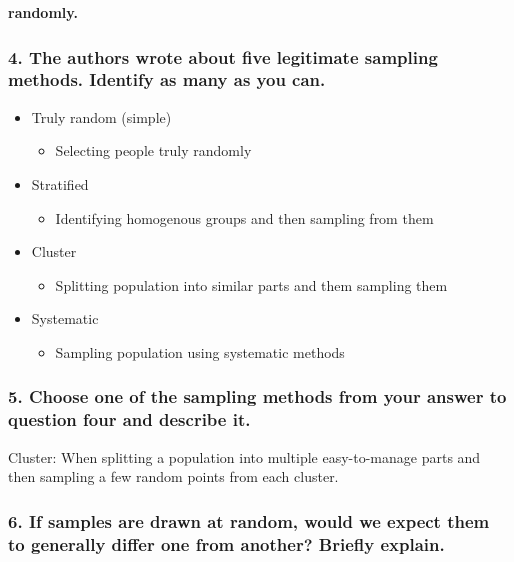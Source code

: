 \documentclass[letterpaper]{article}
\def\tightlist{}
\begin{document}
 \textbf{ randomly. } 

\subsubsection{4. The authors wrote about five legitimate sampling methods. Identify as many as you can.}\label{the-authors-wrote-about-five-legitimate-sampling-methods.-identify-as-many-as-you-can.}

\begin{itemize}
\tightlist
\item
  Truly random (simple)

  \begin{itemize}
  \tightlist
  \item
    Selecting people truly randomly
  \end{itemize}
\item
  Stratified

  \begin{itemize}
  \tightlist
  \item
    Identifying homogenous groups and then sampling from them
  \end{itemize}
\item
  Cluster

  \begin{itemize}
  \tightlist
  \item
    Splitting population into similar parts and them sampling them
  \end{itemize}
\item
  Systematic

  \begin{itemize}
  \tightlist
  \item
    Sampling population using systematic methods
  \end{itemize}
\end{itemize}

\subsubsection{5. Choose one of the sampling methods from your answer to question four and describe it.}\label{choose-one-of-the-sampling-methods-from-your-answer-to-question-four-and-describe-it.}

Cluster: When splitting a population into multiple easy-to-manage parts and then sampling a few random points from each cluster.

\subsubsection{6. If samples are drawn at random, would we expect them to generally differ one from another? Briefly explain.}\label{if-samples-are-drawn-at-random-would-we-expect-them-to-generally-differ-one-from-another-briefly-explain.}
\end{document}
